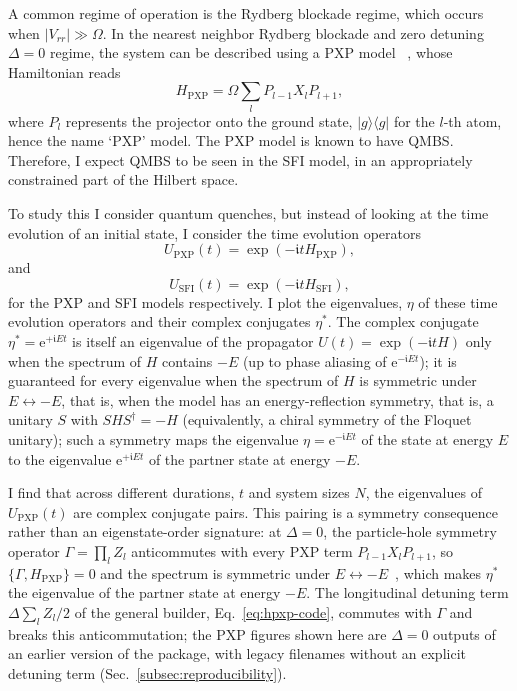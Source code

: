 \documentclass[longbibliography]{revtex4-2}
\newcommand{\im}[0]{\mathfrak{i}}
\begin{document}
A common regime of operation is the Rydberg blockade regime, which
occurs when $|V_{rr}| \gg \Omega$. In the nearest neighbor Rydberg
blockade and zero detuning $\Delta = 0$ regime, the system can be
described using a PXP model
~\cite{turner2018weak, turner2018quantum, maskara2021discrete},
whose Hamiltonian reads
\begin{equation}\label{eq:pxp-notes}
    H_{\mathrm{PXP}} = \Omega \sum_{l} P_{l-1} X_{l} P_{l+1},
\end{equation}
where $P_{l}$ represents the projector onto the ground state,
$| g \rangle \langle g |$ for the $l$-th atom, hence the name `PXP'
model. The PXP model is known to have QMBS. Therefore, I expect QMBS
to be seen in the SFI model, in an appropriately constrained part of
the Hilbert space.

To study this I consider quantum quenches, but instead of looking at
the time evolution of an initial state, I consider the time evolution
operators
\begin{equation}\label{eq:upxp}
    U_{\mathrm{PXP}}(t) = \exp\left(-\im t H_{\mathrm{PXP}}\right),
\end{equation}
and
\begin{equation}\label{eq:usfi}
    U_{\mathrm{SFI}}(t) = \exp\left(-\im t H_{\mathrm{SFI}}\right),
\end{equation}
for the PXP and SFI models respectively. I plot the eigenvalues, $\eta$
of these time evolution operators and their complex conjugates $\eta^*$.
The complex conjugate $\eta^* = \mathrm{e}^{+\im E t}$ is itself an
eigenvalue of the propagator $U(t) = \exp(-\im t H)$ only when the
spectrum of $H$ contains $-E$ (up to phase aliasing of
$\mathrm{e}^{-\im E t}$); it is guaranteed for every eigenvalue when the
spectrum of $H$ is symmetric under $E \leftrightarrow -E$, that is,
when the model has an energy-reflection symmetry,
that is, a unitary $S$ with $S H S^{\dagger} = -H$ (equivalently, a
chiral symmetry of the Floquet unitary); such a symmetry maps the
eigenvalue $\eta = \mathrm{e}^{-\im E t}$ of the state at energy $E$ to
the eigenvalue $\mathrm{e}^{+\im E t}$ of the partner state at energy
$-E$.

I find that across different durations, \(t\) and system sizes \(N\),
the eigenvalues of \(U_{\mathrm{PXP}}(t)\) are complex conjugate
pairs. This pairing is a symmetry consequence rather than an
eigenstate-order signature: at \(\Delta = 0\), the particle-hole
symmetry operator \(\Gamma = \prod_{l} Z_{l}\) anticommutes with every
PXP term \(P_{l-1} X_{l} P_{l+1}\), so
\(\{ \Gamma, H_{\mathrm{PXP}} \} = 0\) and the spectrum is symmetric
under \(E \leftrightarrow -E\)~\cite{turner2018weak}, which makes
\(\eta^*\) the eigenvalue of the partner state at energy \(-E\). The
longitudinal detuning term \(\Delta \sum_{l} Z_{l} / 2\) of the general
builder, Eq.~\eqref{eq:hpxp-code}, commutes with \(\Gamma\) and breaks
this anticommutation; the PXP figures shown here are \(\Delta = 0\)
outputs of an earlier version of the package, with legacy filenames
without an explicit detuning term
(Sec.~\ref{subsec:reproducibility}).
\end{document}
